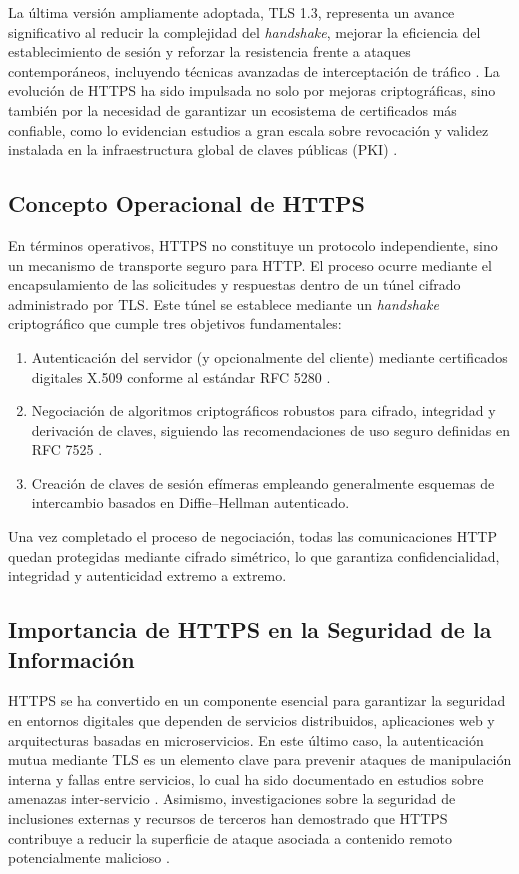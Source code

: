 La última versión ampliamente adoptada, TLS 1.3, representa un avance significativo al reducir la complejidad del \textit{handshake}, mejorar la eficiencia del establecimiento de sesión y reforzar la resistencia frente a ataques contemporáneos, incluyendo técnicas avanzadas de interceptación de tráfico \cite{dowling2015}. La evolución de HTTPS ha sido impulsada no solo por mejoras criptográficas, sino también por la necesidad de garantizar un ecosistema de certificados más confiable, como lo evidencian estudios a gran escala sobre revocación y validez instalada en la infraestructura global de claves públicas (PKI) \cite{liu2015, helme2024}.

\subsection{Concepto Operacional de HTTPS}

En términos operativos, HTTPS no constituye un protocolo independiente, sino un mecanismo de transporte seguro para HTTP. El proceso ocurre mediante el encapsulamiento de las solicitudes y respuestas dentro de un túnel cifrado administrado por TLS. Este túnel se establece mediante un \textit{handshake} criptográfico que cumple tres objetivos fundamentales:

\begin{enumerate}
    \item Autenticación del servidor (y opcionalmente del cliente) mediante certificados digitales X.509 conforme al estándar RFC 5280 \cite{rfc5280}.
    \item Negociación de algoritmos criptográficos robustos para cifrado, integridad y derivación de claves, siguiendo las recomendaciones de uso seguro definidas en RFC 7525 \cite{rfc7525}.
    \item Creación de claves de sesión efímeras empleando generalmente esquemas de intercambio basados en Diffie–Hellman autenticado.
\end{enumerate}

Una vez completado el proceso de negociación, todas las comunicaciones HTTP quedan protegidas mediante cifrado simétrico, lo que garantiza confidencialidad, integridad y autenticidad extremo a extremo.

\subsection{Importancia de HTTPS en la Seguridad de la Información}

HTTPS se ha convertido en un componente esencial para garantizar la seguridad en entornos digitales que dependen de servicios distribuidos, aplicaciones web y arquitecturas basadas en microservicios. En este último caso, la autenticación mutua mediante TLS es un elemento clave para prevenir ataques de manipulación interna y fallas entre servicios, lo cual ha sido documentado en estudios sobre amenazas inter-servicio \cite{sasse2023}. Asimismo, investigaciones sobre la seguridad de inclusiones externas y recursos de terceros han demostrado que HTTPS contribuye a reducir la superficie de ataque asociada a contenido remoto potencialmente malicioso \cite{nikiforakis2012}.


